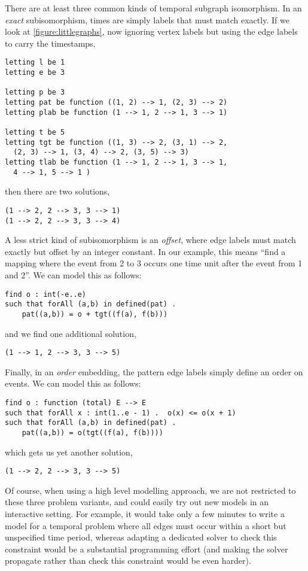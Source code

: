 \documentclass[runningheads]{llncs}
\begin{document}
There are at least three
common kinds of temporal subgraph isomorphism. In an \emph{exact} subisomorphism, times are simply
labels that must match exactly. If we look at \cref{figure:littlegraphs}, now ignoring vertex labels
but using the edge labels to carry the timestamps,
\begin{lstlisting}
letting l be 1
letting e be 3

letting p be 3
letting pat be function ((1, 2) --> 1, (2, 3) --> 2)
letting plab be function (1 --> 1, 2 --> 1, 3 --> 1)

letting t be 5
letting tgt be function ((1, 3) --> 2, (3, 1) --> 2,
  (2, 3) --> 1, (3, 4) --> 2, (3, 5) --> 3)
letting tlab be function (1 --> 1, 2 --> 1, 3 --> 1,
  4 --> 1, 5 --> 1 )
\end{lstlisting}
then there are two solutions,
\begin{lstlisting}
(1 --> 2, 2 --> 3, 3 --> 1)
(1 --> 2, 2 --> 3, 3 --> 4)
\end{lstlisting}

A less strict kind of subisomorphism is an \emph{offset}, where edge labels must match exactly but
offset by an integer constant. In our example, this means ``find a mapping where the event from 2
to 3 occurs one time unit after the event from 1 and 2''. We can model this as follows:
\begin{lstlisting}
find o : int(-e..e)
such that forAll (a,b) in defined(pat) .
    pat((a,b)) = o + tgt((f(a), f(b)))
\end{lstlisting}
and we find one additional solution,
\begin{lstlisting}
(1 --> 1, 2 --> 3, 3 --> 5)
\end{lstlisting}

Finally, in an \emph{order} embedding, the pattern edge labels simply define an order on events. We
can model this as follows:
\begin{lstlisting}
find o : function (total) E --> E
such that forAll x : int(1..e - 1) .  o(x) <= o(x + 1)
such that forAll (a,b) in defined(pat) .
    pat((a,b)) = o(tgt((f(a), f(b))))
\end{lstlisting}
which gets us yet another solution,
\begin{lstlisting}
(1 --> 2, 2 --> 3, 3 --> 5)
\end{lstlisting}

Of course, when using a high level modelling approach, we are not restricted to these three problem
variants, and could easily try out new models in an interactive setting. For example, it would take
only a few minutes to write a model for a temporal problem where all edges must occur within a short
but unspecified time period, whereas adapting a dedicated solver to check this constraint would be a
substantial programming effort (and making the solver propagate rather than check this constraint
would be even harder).
\end{document}
